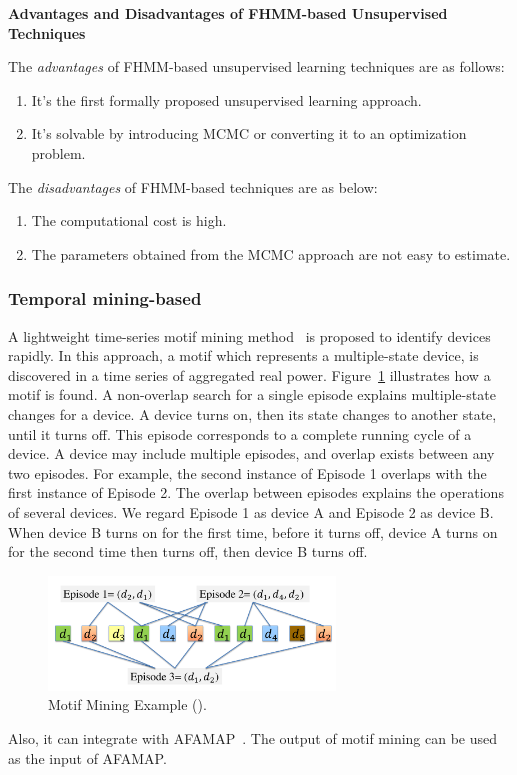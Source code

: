 \textbf{Advantages and Disadvantages of FHMM-based Unsupervised Techniques}

The \textit{advantages} of FHMM-based unsupervised learning techniques are as follows:
\begin{enumerate}
\item It's the first formally proposed unsupervised learning approach.
\item It's solvable by introducing MCMC or converting it to an optimization problem.
\end{enumerate}

The \textit{disadvantages} of FHMM-based techniques are as below:
\begin{enumerate}
\item The computational cost is high. 
\item The parameters obtained from the MCMC approach are not easy to estimate. 
\end{enumerate}

\subsubsection{Temporal mining-based}

A lightweight time-series motif mining method~\cite{shao2012temporal}
is proposed to identify devices rapidly.
In this approach, a motif which represents a multiple-state device,
is discovered in a time series of aggregated real power. 
Figure~\ref{fig_motifSample} illustrates how a motif is found.
A non-overlap search for a single episode explains
multiple-state changes for a device. A device turns on, then
its state changes to another state, until it turns off. 
This episode
corresponds to a complete running cycle of a device. A
device may include multiple episodes, 
and overlap exists between any two episodes. For example,
the second instance of Episode 1 overlaps with the first
instance of Episode 2. The overlap between episodes explains
the operations of several devices. We regard Episode
1 as device A and Episode 2 as device B. When device
B turns on for the first time, before it turns off, device A
turns on for the second time then turns off, then device B
turns off.
\begin{figure}[ht]
\centering
\includegraphics[width=3in]{figs/motifSample.pdf}
\caption{Motif Mining Example (\cite{shao2012temporal}). }
\label{fig_motifSample}
\end{figure}
Also, it can integrate with AFAMAP~\cite{kolter2012aistat}.
The output of motif mining can be used as the input of
AFAMAP.

